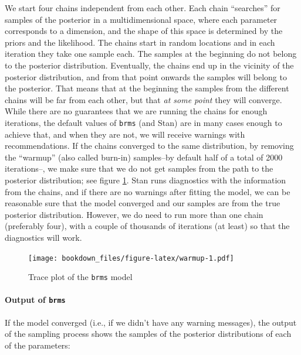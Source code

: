 \documentclass[12pt,]{krantz}
\newenvironment{Shaded}{\begin{snugshade}}{\end{snugshade}}
\newcommand{\KeywordTok}[1]{\textcolor[rgb]{0.13,0.29,0.53}{\textbf{#1}}}
\newcommand{\NormalTok}[1]{#1}
\newcommand{\OperatorTok}[1]{\textcolor[rgb]{0.81,0.36,0.00}{\textbf{#1}}}
\newcommand{\StringTok}[1]{\textcolor[rgb]{0.31,0.60,0.02}{#1}}
\let\oldparagraph\paragraph
\renewcommand{\paragraph}[1]{\oldparagraph{#1}\mbox{}}
\theoremstyle{definition}
\theoremstyle{definition}
\theoremstyle{definition}
\theoremstyle{remark}
\begin{document}
We start four chains independent from each other. Each chain ``searches'' for samples of the posterior in a multidimensional space, where each parameter corresponds to a dimension, and the shape of this space is determined by the priors and the likelihood. The chains start in random locations and in each iteration they take one sample each. The samples at the beginning do not belong to the posterior distribution. Eventually, the chains end up in the vicinity of the posterior distribution, and from that point onwards the samples will belong to the posterior. That means that at the beginning the samples from the different chains will be far from each other, but that \emph{at some point} they will converge. While there are no guarantees that we are running the chains for enough iterations, the default values of \texttt{brms} (and Stan) are in many cases enough to achieve that, and when they are not, we will receive warnings with recommendations. If the chains converged to the same distribution, by removing the ``warmup'' (also called burn-in) samples--by default half of a total of 2000 iterations--, we make sure that we do not get samples from the path to the posterior distribution; see figure \ref{fig:warmup}. Stan runs diagnostics with the information from the chains, and if there are no warnings after fitting the model, we can be reasonable sure that the model converged and our samples are from the true posterior distribution. However, we do need to run more than one chain (preferably four), with a couple of thousands of iterations (at least) so that the diagnostics will work.



\begin{figure}
\centering
\texttt{[image: bookdown\_files/figure-latex/warmup-1.pdf]}
\caption{\label{fig:warmup}Trace plot of the \texttt{brms} model}
\end{figure}

\hypertarget{output-of-brms}{%
\paragraph{\texorpdfstring{Output of \texttt{brms}}{Output of brms}}\label{output-of-brms}}

If the model converged (i.e., if we didn't have any warning messages), the output of the sampling process shows the samples of the posterior distributions of each of the parameters:

\begin{Shaded}
\end{Shaded}
\end{document}
